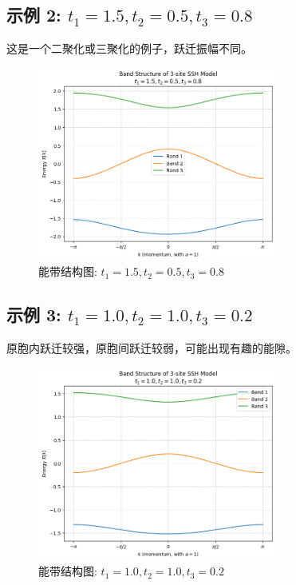 \documentclass[UTF-8]{ctexart}
\begin{document}
\subsection{示例 2: $t_1=1.5, t_2=0.5, t_3=0.8$}
这是一个二聚化或三聚化的例子，跃迁振幅不同。
\begin{figure}[H]
    \centering
    \includegraphics[width=0.7\textwidth]{band_structure_t1_1.5_t2_0.5_t3_0.8_ex2.png}
    \caption{能带结构图: $t_1=1.5, t_2=0.5, t_3=0.8$}
    \label{fig:band2}
\end{figure}

\subsection{示例 3: $t_1=1.0, t_2=1.0, t_3=0.2$}
原胞内跃迁较强，原胞间跃迁较弱，可能出现有趣的能隙。
\begin{figure}[H]
    \centering
    \includegraphics[width=0.7\textwidth]{band_structure_t1_1.0_t2_1.0_t3_0.2_ex3.png}
    \caption{能带结构图: $t_1=1.0, t_2=1.0, t_3=0.2$}
    \label{fig:band3}
\end{figure}
\end{document}

